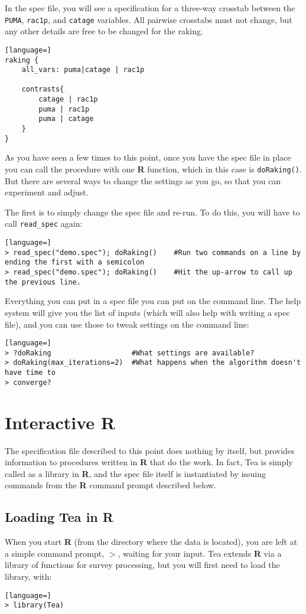 \documentclass{article}
\begin{document}
{In the spec file, you will see a specification for a three-way crosstab between
the {\tt PUMA}, {\tt rac1p}, and {\tt catage} variables. All pairwise crosstabs
must not change, but any other details are free to be changed for the raking.

\begin{lstlisting}[language=]
raking {
    all_vars: puma|catage | rac1p

    contrasts{
        catage | rac1p
        puma | rac1p
        puma | catage
    }
}
\end{lstlisting}

As you have seen a few times to this point, once you have the spec file in place you can
call the procedure with one \textbf{R} function, which in this case is {\tt doRaking()}. But there
are several ways to change the settings as you go, so that you can experiment and adjust.

The first is to simply change the spec file and re-run. To do this, you will have to call
{\tt read\_spec} again:
\begin{lstlisting}[language=]
> read_spec("demo.spec"); doRaking()    #Run two commands on a line by ending the first with a semicolon
> read_spec("demo.spec"); doRaking()    #Hit the up-arrow to call up the previous line.
\end{lstlisting}

Everything you can put in a spec file you can put on the command line. The help system
will give you the list of inputs (which will also help with writing a spec file), and you
can use those to tweak settings on the command line:
\begin{lstlisting}[language=]
> ?doRaking                   #What settings are available?
> doRaking(max_iterations=2)  #What happens when the algorithm doesn't have time to
> converge?
\end{lstlisting}
} %


\section{Interactive R}\label{rsec}
The specification file described to this point does nothing by itself, but provides
information to procedures written in \textbf{R} that do the work. In fact, Tea is simply 
called as a library in \textbf{R}, and the spec file itself is instantiated by 
issuing commands from the \textbf{R} command prompt described below.

\subsection{Loading Tea in R}
When you start \textbf{R} (from the directory where the data is located), you are left at a
simple command prompt, $>$, waiting for your input. Tea extends \textbf{R} via a library of
functions for survey processing, but you will first need to load the library, with:
\begin{lstlisting}[language=]
> library(Tea)
\end{lstlisting}
\end{document}
